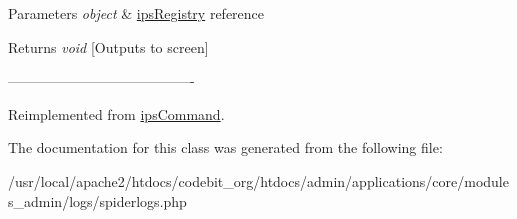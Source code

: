 \begin{DoxyParams}{Parameters}
{\em object} & \hyperlink{classips_registry}{ips\-Registry} reference \\
\hline
\end{DoxyParams}
\begin{DoxyReturn}{Returns}
{\itshape void} \mbox{[}Outputs to screen\mbox{]} 
\end{DoxyReturn}
----------------------------------------\/ 

Reimplemented from \hyperlink{classips_command_afbc4e912a0604b94d47d66744c64d8ba}{ips\-Command}.



The documentation for this class was generated from the following file\-:\begin{DoxyCompactItemize}
\item 
/usr/local/apache2/htdocs/codebit\-\_\-org/htdocs/admin/applications/core/modules\-\_\-admin/logs/spiderlogs.\-php\end{DoxyCompactItemize}

